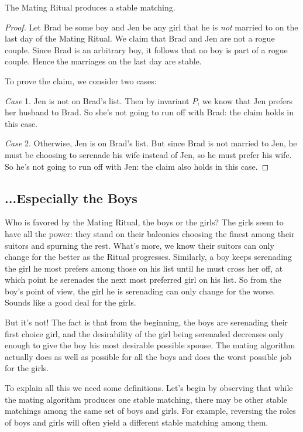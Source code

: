 \begin{theorem}
The Mating Ritual produces a stable matching.
\end{theorem}

\begin{proof}
Let Brad be some boy and Jen be any girl that he is \emph{not} married to
on the last day of the Mating Ritual.  We claim that Brad and Jen are not
a rogue couple.  Since Brad is an arbitrary boy, it follows that no boy is
part of a rogue couple.  Hence the marriages on the last day are stable.

To prove the claim, we consider two cases:

\emph{Case} 1.  Jen is not on Brad's list.  Then by invariant $P$, we know
that Jen prefers her husband to Brad.  So she's not going to run off with
Brad: the claim holds in this case.

\emph{Case} 2.  Otherwise, Jen is on Brad's list.  But since Brad is not
married to Jen, he must be choosing to serenade his wife instead of Jen,
so he must prefer his wife.  So he's not going to run off with Jen: the
claim also holds in this case.
\end{proof}


\subsection{...Especially the Boys}

Who is favored by the Mating Ritual, the boys or the girls?  The girls
seem to have all the power: they stand on their balconies choosing the
finest among their suitors and spurning the rest.  What's more, we know
their suitors can only change for the better as the Ritual progresses.
Similarly, a boy keeps serenading the girl he most prefers among those on
his list until he must cross her off, at which point he serenades the next
most preferred girl on his list.  So from the boy's point of view, the
girl he is serenading can only change for the worse.  Sounds like a good
deal for the girls.

But it's not!  The fact is that from the beginning, the boys are
serenading their first choice girl, and the desirability of the girl being
serenaded decreases only enough to give the boy his most desirable
possible spouse.  The mating algorithm actually does as well as possible
for all the boys and does the worst possible job for the girls.

To explain all this we need some definitions.  Let's begin by observing
that while the mating algorithm produces one stable matching, there may be
other stable matchings among the same set of boys and girls.  For example,
reversing the roles of boys and girls will often yield a different stable
matching among them.

